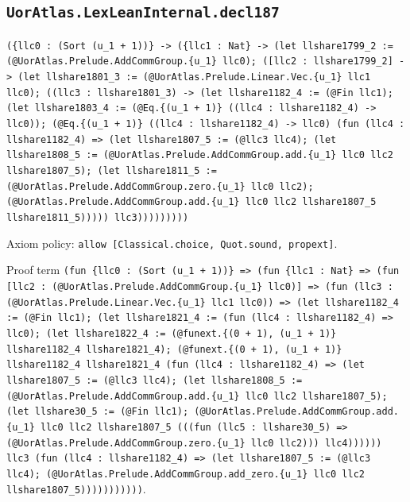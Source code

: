 \documentclass[11pt]{article}
\begin{document}
\subsection*{\texttt{UorAtlas.LexLeanInternal.decl187}}
\noindent\texttt{(\{llc0 : (Sort (u\_1 + 1))\} -> (\{llc1 : Nat\} -> (let llshare1799\_2 := (@UorAtlas.Prelude.AddCommGroup.\{u\_1\} llc0); ([llc2 : llshare1799\_2] -> (let llshare1801\_3 := (@UorAtlas.Prelude.Linear.Vec.\{u\_1\} llc1 llc0); ((llc3 : llshare1801\_3) -> (let llshare1182\_4 := (@Fin llc1); (let llshare1803\_4 := (@Eq.\{(u\_1 + 1)\} ((llc4 : llshare1182\_4) -> llc0)); (@Eq.\{(u\_1 + 1)\} ((llc4 : llshare1182\_4) -> llc0) (fun (llc4 : llshare1182\_4) => (let llshare1807\_5 := (@llc3 llc4); (let llshare1808\_5 := (@UorAtlas.Prelude.AddCommGroup.add.\{u\_1\} llc0 llc2 llshare1807\_5); (let llshare1811\_5 := (@UorAtlas.Prelude.AddCommGroup.zero.\{u\_1\} llc0 llc2); (@UorAtlas.Prelude.AddCommGroup.add.\{u\_1\} llc0 llc2 llshare1807\_5 llshare1811\_5))))) llc3)))))))))}\par
\noindent Axiom policy: \texttt{allow [Classical.choice, Quot.sound, propext]}.\par
\noindent Proof term \texttt{(fun \{llc0 : (Sort (u\_1 + 1))\} => (fun \{llc1 : Nat\} => (fun [llc2 : (@UorAtlas.Prelude.AddCommGroup.\{u\_1\} llc0)] => (fun (llc3 : (@UorAtlas.Prelude.Linear.Vec.\{u\_1\} llc1 llc0)) => (let llshare1182\_4 := (@Fin llc1); (let llshare1821\_4 := (fun (llc4 : llshare1182\_4) => llc0); (let llshare1822\_4 := (@funext.\{(0 + 1), (u\_1 + 1)\} llshare1182\_4 llshare1821\_4); (@funext.\{(0 + 1), (u\_1 + 1)\} llshare1182\_4 llshare1821\_4 (fun (llc4 : llshare1182\_4) => (let llshare1807\_5 := (@llc3 llc4); (let llshare1808\_5 := (@UorAtlas.Prelude.AddCommGroup.add.\{u\_1\} llc0 llc2 llshare1807\_5); (let llshare30\_5 := (@Fin llc1); (@UorAtlas.Prelude.AddCommGroup.add.\{u\_1\} llc0 llc2 llshare1807\_5 (((fun (llc5 : llshare30\_5) => (@UorAtlas.Prelude.AddCommGroup.zero.\{u\_1\} llc0 llc2))) llc4)))))) llc3 (fun (llc4 : llshare1182\_4) => (let llshare1807\_5 := (@llc3 llc4); (@UorAtlas.Prelude.AddCommGroup.add\_zero.\{u\_1\} llc0 llc2 llshare1807\_5)))))))))))}.\par
\end{document}
